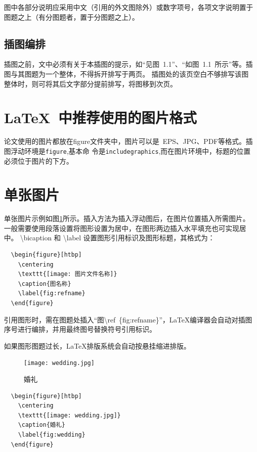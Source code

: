图中各部分说明应采用中文（引用的外文图除外）或数字项号，各项文字说明置于图题之上（有分图题者，置于分图题之上）。

\subsection{插图编排}

插图之前，文中必须有关于本插图的提示，如“见图~1.1”、“如图~1.1~所示”等。插图与其图题为一个整体，不得拆开排写于两页。
插图处的该页空白不够排写该图整体时，则可将其后文字部分提前排写，将图移到次页。

\section{LaTeX~中推荐使用的图片格式}

论文使用的图片都放在figure文件夹中，图片可以是~EPS、JPG、PDF等格式。插图浮动环境是\texttt{figure},基本命
令是\texttt{includegraphics},而在图片环境中，标题的位置必须位于图片的下方。

\section{单张图片}

单张图片示例如图\ref{fig:wedding}所示。插入方法为插入浮动图后，在图片位置插入所需图片。一般需要使用段落设置将图形设置为居中，在图形两边插入水平填充也可实现居中。
\textbackslash bicaption 和 \textbackslash label 设置图形引用标识及图形标题，其格式为：

\begin{lstlisting}
  \begin{figure}[htbp]
    \centering
    \texttt{[image: 图片文件名称]}
    \caption{图名称}
    \label{fig:refname}
  \end{figure}
\end{lstlisting}

引用图形时，需在图题处插入“图\textbackslash ref~\{fig:refname\}”，\LaTeX{}编译器会自动对插图序号进行编排，并用最终图号替换符号引用标识。

如果图形图题过长，\LaTeX{}排版系统会自动按悬挂缩进排版。

\begin{figure}[htbp]
  \centering
  \texttt{[image: wedding.jpg]}
  \caption{婚礼}
  \label{fig:wedding}
\end{figure}

\begin{lstlisting}
  \begin{figure}[htbp]
    \centering
    \texttt{[image: wedding.jpg]}
    \caption{婚礼}
    \label{fig:wedding}
  \end{figure}
\end{lstlisting}

